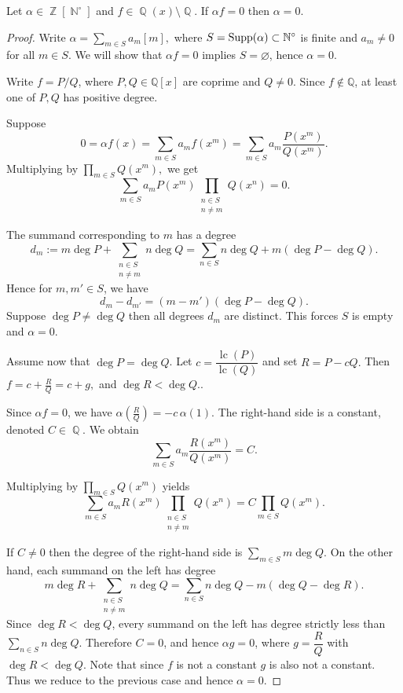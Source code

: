\documentclass[10pt,a4paper]{amsart}
\DeclareMathOperator{\N}{\mathbb{N}}
\DeclareMathOperator{\Q}{\mathbb{Q}}
\DeclareMathOperator{\Z}{\mathbb{Z}}
\DeclareMathOperator{\supp}{{\rm Supp}}
\begin{document}
\begin{lem} Let $\alpha\in \Z[\N^\circ]$ and $f\in \Q(x)\setminus \Q$. If $\alpha f=0$ then  $\alpha=0$.
    
\end{lem}

\begin{proof}
 Write
\( 
\alpha=\sum_{m\in S} a_m[m],
\)
where \(S=\supp(\alpha)\subset \mathbb N^\circ\) is finite and \(a_m\neq 0\) for all \(m\in S\).
We will show that \(\alpha f=0\) implies \(S=\varnothing\), hence \(\alpha=0\).

Write \(f=P/Q\), where \(P,Q\in \mathbb Q[x]\) are coprime and \(Q\neq 0\). Since \(f\notin \mathbb Q\), at least one of \(P,Q\) has positive degree. 

Suppose
\[
0=\alpha f(x)=\sum_{m\in S} a_m f(x^m)=\sum_{m\in S} a_m \frac{P(x^m)}{Q(x^m)}.
\]
Multiplying by
\( 
\prod\limits_{m\in S} Q(x^m),
\)
we get
\[
\sum_{m\in S}
a_m P(x^m)\prod_{\substack{n\in S\\ n\neq m}} Q(x^n)=0.
\]

 The summand corresponding to  \(m\) has a degree
\[
d_m:=m\deg P+\sum_{\substack{n\in S\\ n\neq m}} n\deg Q =\sum_{n\in S} n\deg Q + m(\deg P-\deg Q).
\]
Hence for $m,m'\in S$, we have
\[
d_m-d_{m'}=(m-m')(\deg P-\deg Q). 
\]
Suppose $\deg P\not=\deg Q$ then all  degrees $d_m$ are distinct. This forces $S$ is empty and $\alpha=0$.

 Assume now that \(\deg P=\deg Q\). Let
\(
c=\dfrac{\operatorname{lc}(P)}{\operatorname{lc}(Q)}
\)
and set
\(
R=P-cQ.
\) 
Then
\(
f=c+\frac{R}{Q}=c+g,
\)
and
\(
\deg R<\deg Q.
\).

Since \(\alpha f=0\), we have
\( 
\alpha\!\left(\frac{R}{Q}\right)
=
-c\,\alpha(1).
\)
The right-hand side is a constant, denoted $C\in \Q$. We obtain
\[
\sum_{m\in S} a_m \frac{R(x^m)}{Q(x^m)}=C.
\]


Multiplying by \(\prod_{m\in S}Q(x^m)\) yields
\[
\sum_{m\in S}
a_m R(x^m)
\prod_{\substack{n\in S\\ n\neq m}}
Q(x^n)
=
C\prod_{m\in S}Q(x^m).
\]

If $C\not=0$ then the degree of the right-hand side is
\(
\sum\limits_{m\in S} m\deg Q.
\)
On the other hand, each summand on the left has degree
\[
m\deg R+
\sum_{\substack{n\in S\\ n\neq m}}
n\deg Q
=
\sum_{n\in S} n\deg Q
-
m(\deg Q-\deg R).
\]
Since \(\deg R<\deg Q\), every summand on the left has degree strictly less than
\(\sum_{n\in S} n\deg Q\). Therefore \(C=0\), and hence
\(
\alpha g=0
\), where $g=\dfrac{R}{Q}$ with \(\deg R<\deg Q\). Note that  since $f$ is not a constant $g$ is also not a constant.
Thus we reduce to the previous case and hence  $\alpha=0$.
\end{proof}
\end{document}
